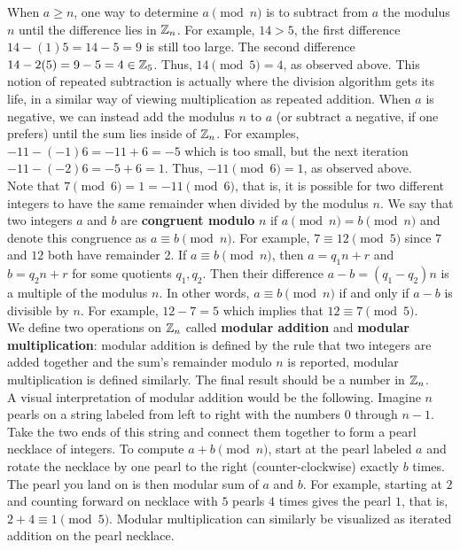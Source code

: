 When $a\ge n$, one way to determine $a\pmod n$ is to subtract from $a$ the modulus $n$ until the difference lies in $\mathbb{Z}_n$. For example, $14>5$, the first difference $14-(1)5 =14-5=  9$ is still too large. The second difference $14-2(5) = 9-5 = 4\in \mathbb{Z}_5$. Thus, $14\pmod 5=4$, as observed above. This notion of repeated subtraction is actually where the division algorithm gets its life, in a similar way of viewing multiplication as repeated addition. When $a$ is negative, we can instead add the modulus $n$ to $a$ (or subtract a negative, if one prefers) until the sum lies inside of $\mathbb{Z}_n$. For examples, $-11-(-1)6=-11+6= -5$ which is too small, but the next iteration $-11-(-2)6 = -5+6 = 1$. Thus, $-11\pmod 6=1$, as observed above. \\

Note that $7\pmod 6 = 1 = -11 \pmod 6$, that is, it is possible for two different integers to have the same remainder when divided by the modulus $n$. We say that two integers $a$ and $b$ are \textbf{congruent modulo}\label{def:modularcongruence} $n$ if $a\pmod n = b\pmod n$ and denote this congruence as $a\equiv b \pmod n$. For example, $7\equiv 12 \pmod 5$ since $7$ and $12$ both have remainder 2. If $a\equiv b \pmod n$, then $a=q_1n + r$ and $b=q_2n+r$ for some quotients $q_1, q_2$. Then their difference $a-b = (q_1-q_2)n$ is a multiple of the modulus $n$. In other words, $a\equiv b \pmod n$ if and only if $a-b$ is divisible by $n$. For example, $12-7=5$ which implies that $12\equiv 7\pmod 5$.\\

 We define two operations on $\mathbb{Z}_n$ called \textbf{modular addition} and \textbf{modular multiplication}: modular addition is defined by the rule that two integers are added together and the sum's remainder modulo $n$ is reported, modular multiplication is defined similarly. The final result should be a number in $\mathbb{Z}_n$.\\

A visual interpretation of modular addition would be the following. Imagine $n$ pearls on a string labeled from left to right with the numbers $0$ through $n-1$. Take the two ends of this string and connect them together to form a pearl necklace of integers. To compute $a+b \pmod n$, start at the pearl labeled $a$ and rotate the necklace by one pearl to the right (counter-clockwise) exactly $b$ times. The pearl you land on is then modular sum of $a$ and $b$. For example, starting at $2$ and counting forward on necklace with $5$ pearls $4$ times gives the pearl $1$, that is, $2+4\equiv 1\pmod 5$.  Modular multiplication can similarly be visualized as iterated addition on the pearl necklace.\\

